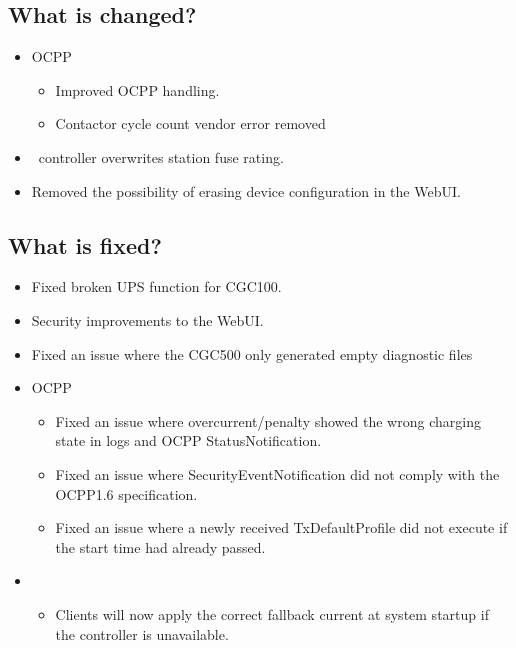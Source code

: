 \documentclass{scrartcl}
\begin{document}
\subsection*{What is changed?}

\begin{itemize}
  \item OCPP
  \begin{itemize}
    \item Improved OCPP handling.
    \item Contactor cycle count vendor error removed
  \end{itemize}
  \item \nanogrid\ controller overwrites station fuse rating.
  \item Removed the possibility of erasing device configuration in the WebUI.
\end{itemize}

\subsection*{What is fixed?}

\begin{itemize}
  \item Fixed broken UPS function for CGC100.
  \item Security improvements to the WebUI.
  \item Fixed an issue where the CGC500 only generated empty diagnostic files
  \item OCPP
  \begin{itemize}
    \item Fixed an issue where overcurrent/penalty showed the wrong charging state in logs and OCPP StatusNotification.
    \item Fixed an issue where SecurityEventNotification did not comply with the OCPP1.6 specification.
    \item Fixed an issue where a newly received TxDefaultProfile did not execute if the start time had already passed.
  \end{itemize}
  \item \nanogrid\
  \begin{itemize}
    \item Clients will now apply the correct fallback current at system startup if the controller is unavailable.
  \end{itemize}
\end{itemize}
\end{document}
